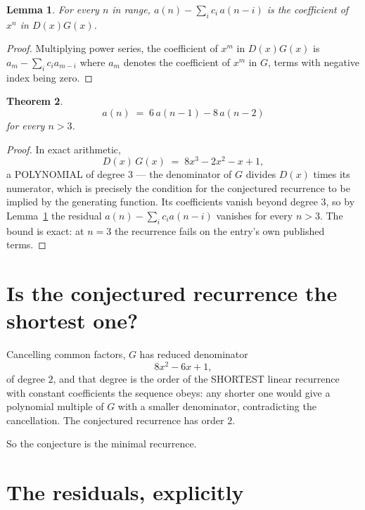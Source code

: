 \documentclass[11pt,a4paper]{article}
\theoremstyle{plain}
\newtheorem{theorem}{Theorem}
\newtheorem{lemma}[theorem]{Lemma}
\theoremstyle{definition}
\begin{document}
\begin{lemma}\label{lem:key}
For every $n$ in range, $a(n)-\sum_i c_i\,a(n-i)$ is the coefficient of $x^{n}$ in
$D(x)G(x)$.
\end{lemma}

\begin{proof}
Multiplying power series, the coefficient of $x^{m}$ in $D(x)G(x)$ is
$a_m-\sum_i c_i a_{m-i}$ where $a_m$ denotes the coefficient of $x^{m}$ in $G$, terms with
negative index being zero.
\end{proof}

\begin{theorem}
\[
a(n)\;=\;6\,a(n-1) - 8\,a(n-2)
\]
for every $n>3$.
\end{theorem}

\begin{proof}
In exact arithmetic,
\[
D(x)\,G(x)\;=\;8 x^{3} - 2 x^{2} - x + 1,
\]
a POLYNOMIAL of degree $3$ --- the denominator of $G$ divides $D(x)$ times its numerator,
which is precisely the condition for the conjectured recurrence to be implied by the
generating function. Its coefficients vanish beyond degree $3$, so by
Lemma~\ref{lem:key} the residual $a(n)-\sum_ic_ia(n-i)$ vanishes for every
$n>3$. The bound is exact: at $n=3$ the recurrence fails on the entry's own published terms.
\end{proof}

\section{Is the conjectured recurrence the shortest one?}

Cancelling common factors, $G$ has reduced denominator
\[
8 x^{2} - 6 x + 1,
\]
of degree $2$, and that degree is the order of the SHORTEST linear recurrence with
constant coefficients the sequence obeys: any shorter one would give a polynomial multiple of
$G$ with a smaller denominator, contradicting the cancellation. The conjectured recurrence has
order $2$.

So the conjecture is the minimal recurrence.

\section{The residuals, explicitly}
\end{document}
